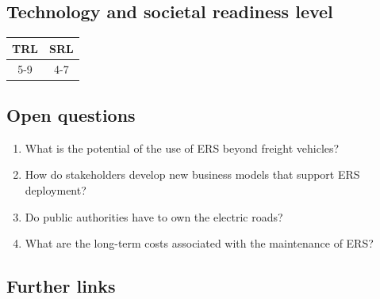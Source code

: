 \documentclass[
]{book}
\providecommand{\tightlist}{%
  \setlength{\itemsep}{0pt}\setlength{\parskip}{0pt}}
\begin{document}
\hypertarget{technology-and-societal-readiness-level-1}{%
\subsection*{Technology and societal readiness level}\label{technology-and-societal-readiness-level-1}}

\begin{longtable}[]{@{}cc@{}}
\toprule
TRL & SRL\tabularnewline
\midrule
\endhead
5-9 & 4-7\tabularnewline
\bottomrule
\end{longtable}

\hypertarget{open-questions-1}{%
\subsection*{Open questions}\label{open-questions-1}}

\begin{enumerate}
\def\labelenumi{\arabic{enumi}.}
\tightlist
\item
  What is the potential of the use of ERS beyond freight vehicles?
\item
  How do stakeholders develop new business models that support ERS deployment?
\item
  Do public authorities have to own the electric roads?
\item
  What are the long-term costs associated with the maintenance of ERS?
\end{enumerate}

\hypertarget{further-links-1}{%
\subsection*{Further links}\label{further-links-1}}
\end{document}
